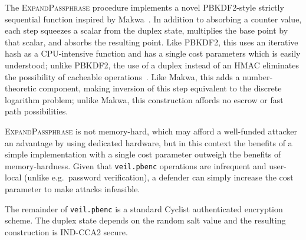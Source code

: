 The \textsc{ExpandPassphrase} procedure implements a novel PBKDF2-style strictly sequential function inspired by
Makwa~\cite{rfc2898, pornin2015}\@.
In addition to absorbing a counter value, each step squeezes a scalar from the duplex state, multiplies the base point
by that scalar, and absorbs the resulting point.
Like PBKDF2, this uses an iterative hash as a CPU-intensive function and has a single cost parameters which is easily
understood;
unlike PBKDF2, the use of a duplex instead of an HMAC eliminates the possibility of cacheable
operations~\cite{visconti2015}\@.
Like Makwa, this adds a number-theoretic component, making inversion of this step equivalent to the discrete logarithm
problem;
unlike Makwa, this construction affords no escrow or fast path possibilities.

\textsc{ExpandPassphrase} is not memory-hard, which may afford a well-funded attacker an advantage by using dedicated
hardware, but in this context the benefits of a simple implementation with a single cost parameter outweigh the benefits
of memory-hardness.
Given that \texttt{veil.pbenc} operations are infrequent and user-local (unlike e.g.\ password verification), a defender
can simply increase the cost parameter to make attacks infeasible.

The remainder of \texttt{veil.pbenc} is a standard Cyclist authenticated encryption scheme.
The duplex state depends on the random salt value and the resulting construction is IND-CCA2 secure.
